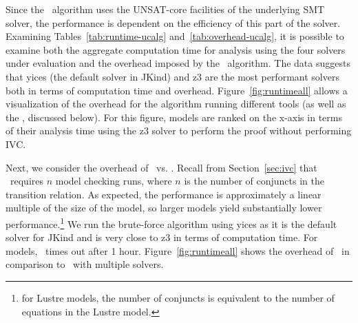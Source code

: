 Since the \ucalg\ algorithm uses the UNSAT-core facilities of the underlying SMT solver, the performance is dependent on the efficiency of this part of the solver.  Examining Tables~\ref{tab:runtime-ucalg} and~\ref{tab:overhead-ucalg}, it is possible to examine both the aggregate computation time for analysis using the four solvers under evaluation and the overhead imposed by the \ucalg\ algorithm.  The data suggests that yices (the default solver in JKind) and z3 are the most performant solvers both in terms of computation time and overhead.  Figure~\ref{fig:runtimeall} allows a visualization of the overhead for the \ucalg algorithm running different tools (as well as the \bfalg, discussed below).  For this figure, models are ranked on the x-axis in terms of their analysis time using the z3 solver to perform the proof without performing IVC.






Next, we consider the overhead of \ucalg\ vs. \bfalg.  Recall from Section~\ref{sec:ivc} that \bfalg\ requires $n$ model checking runs, where $n$ is the number of conjuncts in the transition relation. As expected, the performance is approximately a linear multiple of the size of the model, so larger models yield substantially lower performance.\footnote{for Lustre models, the number of conjuncts is equivalent to the number of equations in the Lustre model.}  We run the brute-force algorithm using yices as it is the default solver for JKind and is very close to z3 in terms of computation time.  For  models, \bfalg\ times out after 1 hour.   Figure~\ref{fig:runtimeall} shows the overhead of \bfalg\ in comparison to \ucalg\ with multiple solvers.

